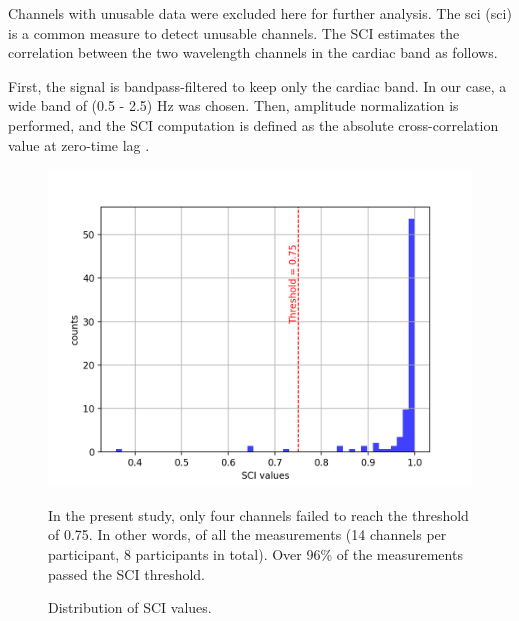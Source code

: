 Channels with unusable data were excluded here for further analysis. The \acrlong{sci} (\acrshort{sci}) \citep {Pollonini2013} is a common measure to detect unusable channels. The SCI estimates the correlation between the two wavelength channels in the cardiac band as follows.

First, the signal is bandpass-filtered to keep only the cardiac band. In our case, a wide band of (0.5 - 2.5) Hz was chosen. Then, amplitude normalization is performed, and the SCI computation is defined as the absolute cross-correlation value at zero-time lag \citep {Pollonini2013}.


\begin{figure}[H]
  \centering
    \includegraphics[scale=.75]{bilder/SCI_hist.png}
  \caption{Distribution of SCI values.}
   \label{fig:somesignal}
    \medskip
     \small {In the present study, only four channels failed to reach the threshold of 0.75. In other words, of all the measurements (14 channels per participant, 8 participants in total). Over 96\% of the measurements passed the SCI threshold.}
 
\end{figure}




